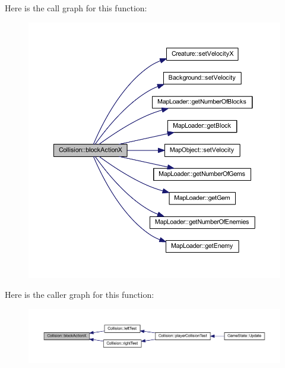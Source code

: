 Here is the call graph for this function\+:
\nopagebreak
\begin{figure}[H]
\begin{center}
\leavevmode
\includegraphics[width=350pt]{class_collision_a8daccc0201f916f571afbbd8da992ffb_cgraph}
\end{center}
\end{figure}




Here is the caller graph for this function\+:
\nopagebreak
\begin{figure}[H]
\begin{center}
\leavevmode
\includegraphics[width=350pt]{class_collision_a8daccc0201f916f571afbbd8da992ffb_icgraph}
\end{center}
\end{figure}


